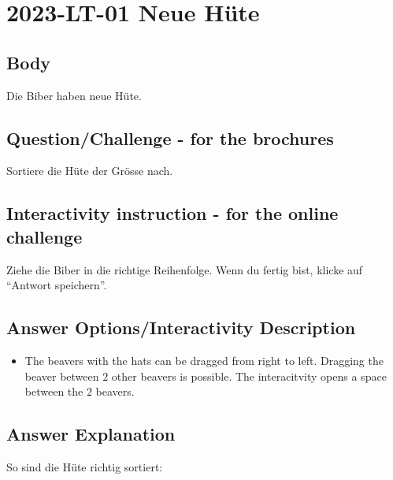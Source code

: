 \documentclass[a4paper,11pt]{report}
\newcommand{\taskGraphicsFolder}{..}
\begin{document}
\section*{\centering{} 2023-LT-01 Neue Hüte}


\subsection*{Body}

Die Biber haben neue Hüte.

{\centering%
\par}

{\em


\subsection*{Question/Challenge - for the brochures}

Sortiere die Hüte der Grösse nach.

}


\subsection*{Interactivity instruction - for the online challenge}

Ziehe die Biber in die richtige Reihenfolge. Wenn du fertig bist, klicke auf \enquote{Antwort speichern}.

\begingroup
\renewcommand{\arraystretch}{1.5}
\subsection*{Answer Options/Interactivity Description}

\begin{itemize}
  \item The beavers with the hats can be dragged from right to left. Dragging the beaver between $2$ other beavers is possible. The interacitvity opens a space between the $2$ beavers.
\end{itemize}

\endgroup

\subsection*{Answer Explanation}

So sind die Hüte richtig sortiert:

{\centering%
\raisebox{-0.5ex}{}   \raisebox{-0.5ex}{}\par}
\end{document}
